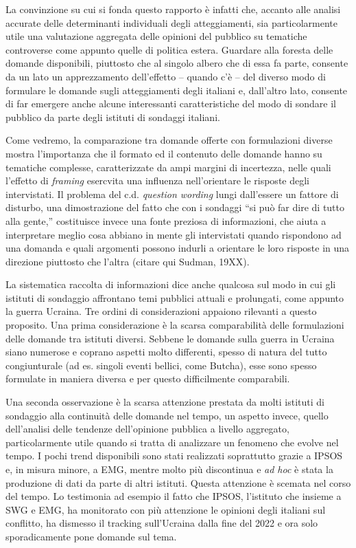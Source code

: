 \documentclass[
]{book}
\begin{document}
La convinzione su cui si fonda questo rapporto è infatti che, accanto alle analisi accurate delle determinanti individuali degli atteggiamenti, sia particolarmente utile una valutazione aggregata delle opinioni del pubblico su tematiche controverse come appunto quelle di politica estera. Guardare alla foresta delle domande disponibili, piuttosto che al singolo albero che di essa fa parte, consente da un lato un apprezzamento dell'effetto -- quando c'è -- del diverso modo di formulare le domande sugli atteggiamenti degli italiani e, dall'altro lato, consente di far emergere anche alcune interessanti caratteristiche del modo di sondare il pubblico da parte degli istituti di sondaggi italiani.

Come vedremo, la comparazione tra domande offerte con formulazioni diverse mostra l'importanza che il formato ed il contenuto delle domande hanno su tematiche complesse, caratterizzate da ampi margini di incertezza, nelle quali l'effetto di \emph{framing} esercvita una influenza nell'orientare le risposte degli intervistati. Il problema del c.d. \emph{question wording} lungi dall'essere un fattore di disturbo, una dimostrazione del fatto che con i sondaggi ``si può far dire di tutto alla gente,'' costituisce invece una fonte preziosa di informazioni, che aiuta a interpretare meglio cosa abbiano in mente gli intervistati quando rispondono ad una domanda e quali argomenti possono indurli a orientare le loro risposte in una direzione piuttosto che l'altra (citare qui Sudman, 19XX).

La sistematica raccolta di informazioni dice anche qualcosa sul modo in cui gli istituti di sondaggio affrontano temi pubblici attuali e prolungati, come appunto la guerra Ucraina. Tre ordini di considerazioni appaiono rilevanti a questo proposito. Una prima considerazione è la scarsa comparabilità delle formulazioni delle domande tra istituti diversi. Sebbene le domande sulla guerra in Ucraina siano numerose e coprano aspetti molto differenti, spesso di natura del tutto congiunturale (ad es. singoli eventi bellici, come Butcha), esse sono spesso formulate in maniera diversa e per questo difficilmente comparabili.

Una seconda osservazione è la scarsa attenzione prestata da molti istituti di sondaggio alla continuità delle domande nel tempo, un aspetto invece, quello dell'analisi delle tendenze dell'opinione pubblica a livello aggregato, particolarmente utile quando si tratta di analizzare un fenomeno che evolve nel tempo. I pochi trend disponibili sono stati realizzati soprattutto grazie a IPSOS e, in misura minore, a EMG, mentre molto più discontinua e \emph{ad hoc} è stata la produzione di dati da parte di altri istituti. Questa attenzione è scemata nel corso del tempo. Lo testimonia ad esempio il fatto che IPSOS, l'istituto che insieme a SWG e EMG, ha monitorato con più attenzione le opinioni degli italiani sul conflitto, ha dismesso il tracking sull'Ucraina dalla fine del 2022 e ora solo sporadicamente pone domande sul tema.
\end{document}
